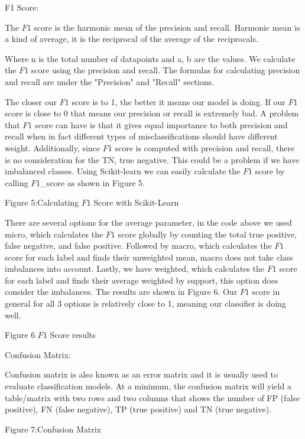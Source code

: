 \documentclass[a4paper,12pt]{report}
\begin{document}
F1 Score:

The $F1$ score is the harmonic mean of the precision and recall. Harmonic mean is a kind of average, it is the reciprocal of the average of the reciprocals.


Where n is the total number of datapoints and a, b are the values.
We calculate the $F1$ score using the precision and recall. The formulas for calculating precision and recall are under the "Precision" and "Recall" sections. 

 

The closer our $F1$ score is to 1, the better it means our model is doing. If our $F1$ score is close to 0 that means our precision or recall is extremely bad. A problem that $F1$ score can have is that it gives equal importance to both precision and recall when in fact different types of misclassifications should have different weight. Additionally, since $F1$ score is computed with precision and recall, there is no consideration for the TN, true negative. This could be a problem if we have imbalanced classes. Using Scikit-learn we can easily calculate the $F1$ score by calling $F1$\_score as shown in Figure 5.


Figure 5:Calculating $F1$ Score with Scikit-Learn

There are several options for the average parameter, in the code above we used micro, which calculates the $F1$ score globally by counting the total true positive, false negative, and false positive. Followed by macro, which calculates the $F1$ score for each label and finds their unweighted mean, macro does not take class imbalances into account. Lastly, we have weighted, which calculates the $F1$ score for each label and finds their average weighted by support, this option does consider the imbalances. The results are shown in Figure 6. Our $F1$ score in general for all 3 options is relatively close to 1, meaning our classifier is doing well.


Figure 6 $F1$ Score results

 
Confusion Matrix:

Confusion matrix is also known as an error matrix and it is usually used to evaluate classification models. At a minimum, the confusion matrix will yield a table/matrix with two rows and two columns that shows the number of FP (false positive), FN (false negative), TP (true positive) and TN (true negative).

Figure 7:Confusion Matrix
 
\end{document}
